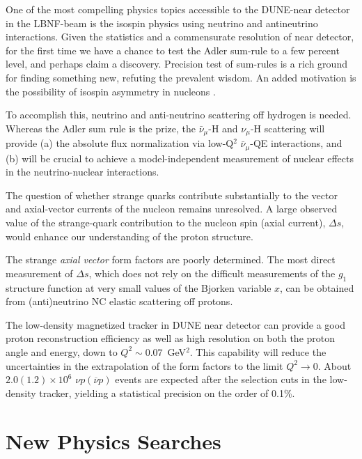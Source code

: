One of the most compelling physics topics 
accessible to the DUNE-near detector in the LBNF-beam is the isospin physics 
using neutrino and antineutrino interactions. Given the statistics and a commensurate 
resolution of near detector, for the first time we have a chance to test the Adler sum-rule to a 
few percent level, and perhaps claim a discovery. 
Precision test of sum-rules is a rich ground for finding something new, refuting the prevalent wisdom. 
An added motivation is the possibility of isospin asymmetry in nucleons . 

To accomplish this, neutrino and anti-neutrino scattering off hydrogen is needed. 
Whereas the Adler sum rule is the prize, the $\bar \nu_\mu$-H and $\nu_\mu$-H scattering
will provide (a)  the 
absolute flux normalization via low-Q$^2$ $\bar \nu_\mu$-QE interactions,  
and (b) will be crucial to achieve a model-independent measurement of nuclear effects in the 
neutrino-nuclear interactions. 

The question of whether strange
  quarks contribute substantially to the vector and axial-vector
  currents of the nucleon remains unresolved. A large observed value of the
  strange-quark contribution to the nucleon spin (axial current),
  $\Delta s$, would enhance our understanding of the proton structure.

The strange \emph{axial vector} form factors are poorly 
determined. The most direct measurement of $\Delta s$, which does not rely on the difficult
measurements of the $g_1$ structure function at very small values of the Bjorken variable $x$, 
can be obtained from (anti)neutrino NC elastic scattering off protons.  %

The low-density magnetized tracker in DUNE near detector can provide a good proton reconstruction efficiency as well as
high resolution on both the proton angle and energy, down to $Q^2\sim0.07$~GeV$^2$. 
This capability will reduce the uncertainties in the extrapolation of the form factors to the limit
$Q^2 \to 0$. About $2.0 (1.2) \times 10^6$ $\nu p
(\overline{\nu} p)$ events are expected after the selection cuts in
the low-density tracker, yielding a statistical precision on the order
of 0.1\%.


\section{New Physics Searches} 
\label{sec-nd-np} 

